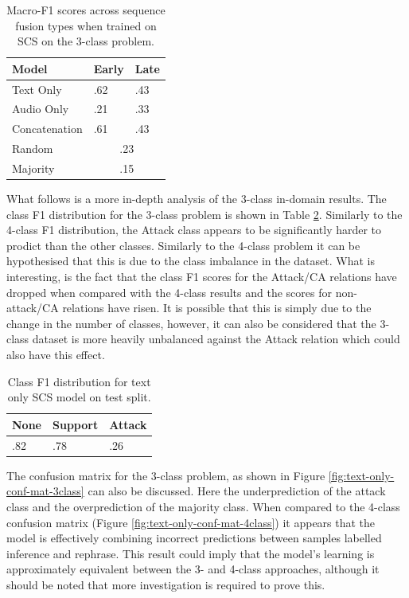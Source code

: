 \documentclass[twocolumn]{article}
\begin{document}
\begin{table}[h]
\centering
\caption{Macro-F1 scores across sequence fusion types when trained on SCS on the 3-class problem. \label{tbl:results-seq-3class}}
\begin{tabular}{|l|ll|}
\hline
Model         & Early       & Late      \\ \hline
Text Only     & .62         & .43    \\
Audio Only    & .21         & .33    \\
Concatenation & .61         & .43    \\ \hline
Random        & \multicolumn{2}{c|}{.23} \\
Majority      & \multicolumn{2}{c|}{.15} \\ \hline
\end{tabular}
\end{table}

What follows is a more in-depth analysis of the 3-class in-domain
results. The class F1 distribution for the 3-class problem is shown in
Table \ref{tbl:class-f1-3class}. Similarly to the 4-class F1
distribution, the Attack class appears to be significantly harder to
prodict than the other classes. Similarly to the 4-class problem it can
be hypothesised that this is due to the class imbalance in the dataset.
What is interesting, is the fact that the class F1 scores for the
Attack/CA relations have dropped when compared with the 4-class results
and the scores for non-attack/CA relations have risen. It is possible
that this is simply due to the change in the number of classes, however,
it can also be considered that the 3-class dataset is more heavily
unbalanced against the Attack relation which could also have this
effect.

\begin{table}[h]
\centering
\caption{Class F1 distribution for text only SCS model on test split.\label{tbl:class-f1-3class}}
\begin{tabular}{|lll|}
\hline
None & Support & Attack              \\ \hline
.82         & .78         & .26  \\ \hline
\end{tabular}
\end{table}

The confusion matrix for the 3-class problem, as shown in Figure
\ref{fig:text-only-conf-mat-3class} can also be discussed. Here the
underprediction of the attack class and the overprediction of the
majority class. When compared to the 4-class confusion matrix (Figure
\ref{fig:text-only-conf-mat-4class}) it appears that the model is
effectively combining incorrect predictions between samples labelled
inference and rephrase. This result could imply that the model's
learning is approximately equivalent between the 3- and 4-class
approaches, although it should be noted that more investigation is
required to prove this.
\end{document}
